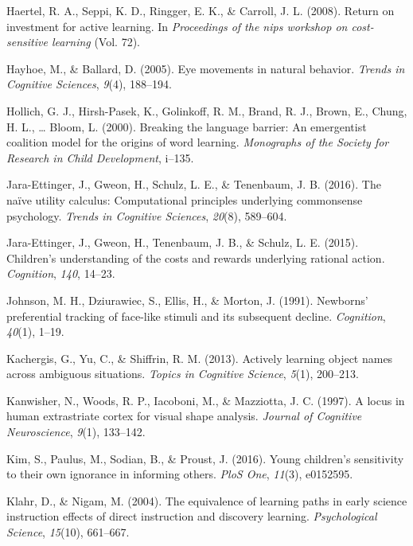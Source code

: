 \documentclass[oneside]{report}
\begin{document}
\hypertarget{ref-haertel2008return}{}
Haertel, R. A., Seppi, K. D., Ringger, E. K., \& Carroll, J. L. (2008).
Return on investment for active learning. In \emph{Proceedings of the
nips workshop on cost-sensitive learning} (Vol. 72).

\hypertarget{ref-hayhoe2005eye}{}
Hayhoe, M., \& Ballard, D. (2005). Eye movements in natural behavior.
\emph{Trends in Cognitive Sciences}, \emph{9}(4), 188--194.

\hypertarget{ref-hollich2000breaking}{}
Hollich, G. J., Hirsh-Pasek, K., Golinkoff, R. M., Brand, R. J., Brown,
E., Chung, H. L., \ldots{} Bloom, L. (2000). Breaking the language
barrier: An emergentist coalition model for the origins of word
learning. \emph{Monographs of the Society for Research in Child
Development}, i--135.

\hypertarget{ref-jara2016naive}{}
Jara-Ettinger, J., Gweon, H., Schulz, L. E., \& Tenenbaum, J. B. (2016).
The naïve utility calculus: Computational principles underlying
commonsense psychology. \emph{Trends in Cognitive Sciences},
\emph{20}(8), 589--604.

\hypertarget{ref-jara2015children}{}
Jara-Ettinger, J., Gweon, H., Tenenbaum, J. B., \& Schulz, L. E. (2015).
Children's understanding of the costs and rewards underlying rational
action. \emph{Cognition}, \emph{140}, 14--23.

\hypertarget{ref-johnson1991newborns}{}
Johnson, M. H., Dziurawiec, S., Ellis, H., \& Morton, J. (1991).
Newborns' preferential tracking of face-like stimuli and its subsequent
decline. \emph{Cognition}, \emph{40}(1), 1--19.

\hypertarget{ref-kachergis2013actively}{}
Kachergis, G., Yu, C., \& Shiffrin, R. M. (2013). Actively learning
object names across ambiguous situations. \emph{Topics in Cognitive
Science}, \emph{5}(1), 200--213.

\hypertarget{ref-kanwisher1997locus}{}
Kanwisher, N., Woods, R. P., Iacoboni, M., \& Mazziotta, J. C. (1997). A
locus in human extrastriate cortex for visual shape analysis.
\emph{Journal of Cognitive Neuroscience}, \emph{9}(1), 133--142.

\hypertarget{ref-kim2016young}{}
Kim, S., Paulus, M., Sodian, B., \& Proust, J. (2016). Young children's
sensitivity to their own ignorance in informing others. \emph{PloS One},
\emph{11}(3), e0152595.

\hypertarget{ref-klahr2004equivalence}{}
Klahr, D., \& Nigam, M. (2004). The equivalence of learning paths in
early science instruction effects of direct instruction and discovery
learning. \emph{Psychological Science}, \emph{15}(10), 661--667.
\end{document}
